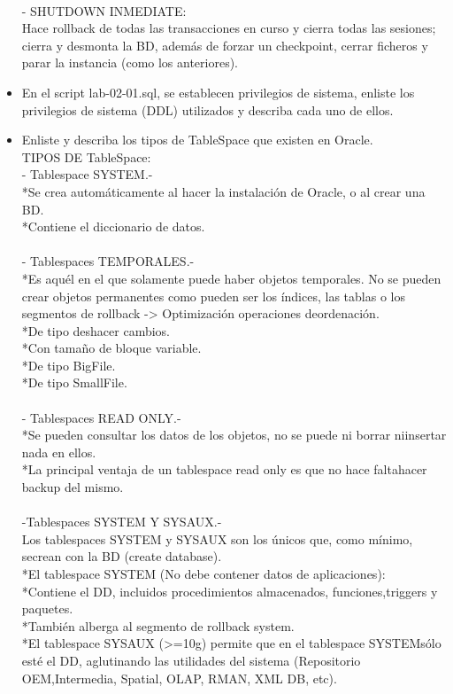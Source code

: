\begin{itemize}
   \\- SHUTDOWN INMEDIATE:
   \\Hace rollback de todas las transacciones en curso y cierra todas las sesiones; cierra y desmonta la BD, además de forzar un checkpoint, cerrar ficheros y parar la instancia (como los anteriores).
   \\
   \item En el script lab-02-01.sql, se establecen privilegios de sistema, enliste los privilegios de sistema (DDL) 
   utilizados y describa cada uno de ellos.
   \\

   \item Enliste y describa los tipos de TableSpace que existen en Oracle.
   \\TIPOS DE TableSpace:
   \\- Tablespace SYSTEM.-
   \\*Se crea automáticamente al hacer la instalación de Oracle, o al crear una BD.
   \\*Contiene el diccionario de datos.
   \\
   \\- Tablespaces TEMPORALES.-
   \\*Es aquél en el que solamente puede haber objetos temporales. No se pueden crear objetos permanentes como pueden ser los índices, las tablas o los segmentos de rollback -> Optimización operaciones deordenación.
   \\*De tipo deshacer cambios.
   \\*Con tamaño de bloque variable.
   \\*De tipo BigFile.
   \\*De tipo SmallFile.
   \\
   \\- Tablespaces READ ONLY.-
   \\*Se pueden consultar los datos de los objetos, no se puede ni borrar niinsertar nada en ellos.
   \\*La principal ventaja de un tablespace read only es que no hace faltahacer backup del mismo.
   \\
   \\-Tablespaces SYSTEM Y SYSAUX.-
   \\Los tablespaces SYSTEM y SYSAUX son los únicos que, como mínimo, secrean con la BD (create database).
   \\*El tablespace SYSTEM (No debe contener datos de aplicaciones):
   \\*Contiene el DD, incluidos procedimientos almacenados, funciones,triggers y paquetes.
   \\*También alberga al segmento de rollback system.
   \\*El tablespace SYSAUX (>=10g) permite que en el tablespace SYSTEMsólo esté el DD, aglutinando las utilidades del sistema (Repositorio OEM,Intermedia, Spatial, OLAP, RMAN, XML DB, etc).
 \\
 \end{itemize}
